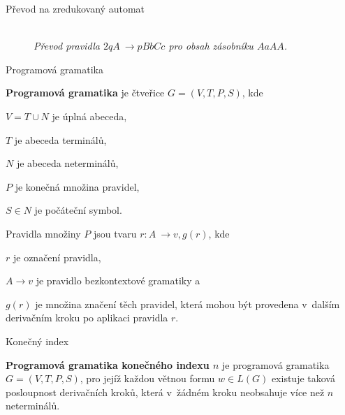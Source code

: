 \documentclass[a4paper,fyma3]{prosper}
\theoremstyle{definition}
\begin{document}
\begin{slide}{Převod na zredukovaný automat}

\bigskip
\bigskip
\bigskip

\begin{figure}[h!]
\centering
{} \bigskip \\
\emph{Převod pravidla $2 q A~\rightarrow p BbCc$ pro obsah zásobníku $AaAA$.}
\end{figure}


\end{slide}


\begin{slide}{Programová gramatika}


\textbf{Programová gramatika} je čtveřice $G = (V,T,P,S)$, kde 

\begin{description*}
\item[$V = T \cup N$] je úplná abeceda, 
\item[$T$] je abeceda terminálů, 
\item[$N$] je abeceda neterminálů, 
\item[$P$] je konečná množina pravidel,
\item[$S \in N$] je počáteční symbol. 

\end{description*}

Pravidla množiny $P$ jsou tvaru $r \colon A~\rightarrow v, g(r)$, kde 

\begin{description*}
\item[$r$] je označení pravidla, 
\item[$A \rightarrow v$] je pravidlo bezkontextové gramatiky a 
\item[$g(r)$] je množina značení těch pravidel, která mohou být provedena v~dalším derivačním kroku po aplikaci pravidla $r$.
\end{description*}


\end{slide}
\begin{slide}{Konečný index}

\bigskip


\textbf{Programová gramatika konečného indexu $n$} je programová gramatika $G = (V,T,P,S)$, pro jejíž každou větnou formu $w \in L(G)$ existuje taková posloupnost derivačních kroků, která v~žádném kroku neobsahuje více než $n$ neterminálů.


\end{slide}
\end{document}
